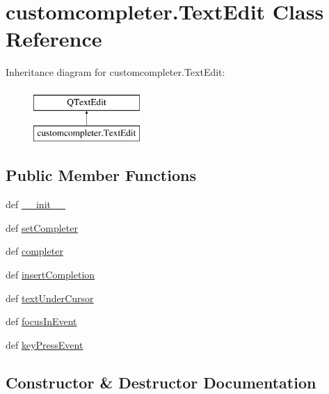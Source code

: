 \hypertarget{classcustomcompleter_1_1TextEdit}{}\section{customcompleter.\+Text\+Edit Class Reference}
\label{classcustomcompleter_1_1TextEdit}
Inheritance diagram for customcompleter.\+Text\+Edit\+:\begin{figure}[H]
\begin{center}
\leavevmode
\includegraphics[height=2.000000cm]{classcustomcompleter_1_1TextEdit}
\end{center}
\end{figure}
\subsection*{Public Member Functions}
\begin{DoxyCompactItemize}
\item 
def \hyperlink{classcustomcompleter_1_1TextEdit_a2169b1ef1787b0fedc0756ea5c7b4c5c}{\+\_\+\+\_\+init\+\_\+\+\_\+}
\item 
def \hyperlink{classcustomcompleter_1_1TextEdit_ad0fe83134bdce992e4bd9accf6713811}{set\+Completer}
\item 
def \hyperlink{classcustomcompleter_1_1TextEdit_a4fdfce83820a827fd58f19c17397f2ce}{completer}
\item 
def \hyperlink{classcustomcompleter_1_1TextEdit_a1fa16733a1c928580308a4d1a9549a96}{insert\+Completion}
\item 
def \hyperlink{classcustomcompleter_1_1TextEdit_a12ca97a35caf223b60667230b17f86be}{text\+Under\+Cursor}
\item 
def \hyperlink{classcustomcompleter_1_1TextEdit_abc14a737614f012310aa150b2d122da5}{focus\+In\+Event}
\item 
def \hyperlink{classcustomcompleter_1_1TextEdit_a9ae7965c1fd37b1c42c299c3e397bbcf}{key\+Press\+Event}
\end{DoxyCompactItemize}


\subsection{Constructor \& Destructor Documentation}
\hypertarget{classcustomcompleter_1_1TextEdit_a2169b1ef1787b0fedc0756ea5c7b4c5c}{}
